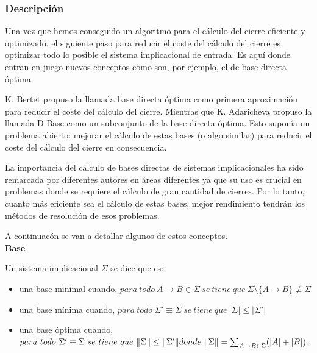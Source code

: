 \subsubsection{Descripci\'on} 


Una vez que hemos conseguido un algoritmo para el c\'alculo del cierre eficiente y optimizado, el siguiente paso para reducir el coste del c\'alculo del cierre es optimizar todo lo posible el sistema implicacional de entrada. Es aqu\'i donde entran en juego nuevos conceptos como son, por ejemplo, el de base directa \'optima.

K. Bertet \cite{BERTET20102155} propuso la llamada base directa \'optima como primera aproximaci\'on para reducir el coste del c\'alculo del cierre. Mientras que  K. Adaricheva \cite{Adaricheva} propuso la llamada D-Base como un subconjunto de la base directa \'optima. Esto supon\'ia un problema abierto: mejorar el c\'alculo de estas bases (o algo similar) para reducir el coste del c\'alculo del cierre en consecuencia.

La importancia del c\'alculo de bases directas de sistemas implicacionales ha sido remarcada por diferentes autores en \'areas diferentes ya que su uso es crucial en problemas donde se requiere el c\'alculo de gran cantidad de cierres. Por lo tanto, cuanto m\'as eficiente sea el c\'alculo de estas bases, mejor rendimiento tendr\'an los m\'etodos de resoluci\'on de esos problemas. 

A continuac\'on se van a detallar algunos de estos conceptos.\\


\textbf{Base}

Un sistema implicacional \( \Sigma \) se dice que es:
\begin{itemize}
    \item una base minimal cuando,  \( para \ todo \ A \to B \in \Sigma \ se \ tiene \ que \ \Sigma \setminus \{A \to B\} \not\equiv \Sigma\)

    \item una base m\'inima cuando,  \( para \ todo \ \Sigma' \equiv \Sigma \ se \ tiene \ que \ |\Sigma| \leq |\Sigma'|\)

    \item una base \'optima cuando,  \( para \ todo \ \Sigma' \equiv \Sigma \ se \ tiene \ que \ \|\Sigma\| \leq \|\Sigma'\| \\ donde \ \|\Sigma\| = 
    \sum_{\substack{A \to B \in \Sigma}} (|A|+|B|) \).
\end{itemize}

